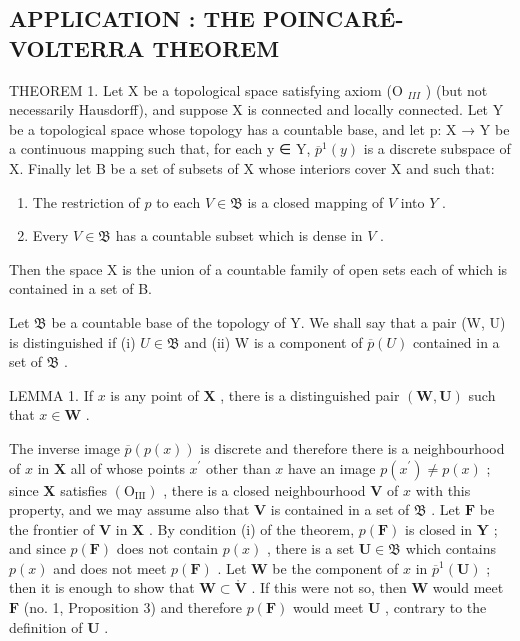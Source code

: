 \subsection{APPLICATION : THE POINCARÉ-VOLTERRA THEOREM}

THEOREM 1. Let X be a topological space satisfying axiom (O \(_{III}\) ) (but not necessarily Hausdorff), and suppose X is connected and locally connected. Let Y be a topological space whose topology has a countable base, and let p: X → Y be a continuous mapping such that, for each y ∈ Y, \(\overline{p}^{1}(y)\) is a discrete subspace of X. Finally let B be a set of subsets of X whose interiors cover X and such that:

\begin{enumerate}
\def\labelenumi{(\roman{enumi})}
\tightlist
\item
  The restriction of \(p\) to each \(V \in \mathfrak{B}\) is a closed mapping of \(V\) into \(Y\) .\\
\item
  Every \(V \in \mathfrak{B}\) has a countable subset which is dense in \(V\) .
\end{enumerate}

Then the space X is the union of a countable family of open sets each of which is contained in a set of B.

Let \(\mathfrak{B}\) be a countable base of the topology of Y. We shall say that a pair (W, U) is distinguished if (i) \(U \in \mathfrak{B}\) and (ii) W is a component of \(\overline{p}(U)\) contained in a set of \(\mathfrak{B}\) .

LEMMA 1. If \(x\) is any point of \(\mathbf{X}\) , there is a distinguished pair \((\mathbf{W}, \mathbf{U})\) such that \(x \in \mathbf{W}\) .

The inverse image \(\overline{p} (p(x))\) is discrete and therefore there is a neighbourhood of \(x\) in \(\mathbf{X}\) all of whose points \(x^{\prime}\) other than \(x\) have an image \(p(x^{\prime})\neq p(x)\) ; since \(\mathbf{X}\) satisfies \((\mathrm{O}_{\mathrm{III}})\) , there is a closed neighbourhood \(\mathbf{V}\) of \(x\) with this property, and we may assume also that \(\mathbf{V}\) is contained in a set of \(\mathfrak{B}\) . Let \(\mathbf{F}\) be the frontier of \(\mathbf{V}\) in \(\mathbf{X}\) . By condition (i) of the theorem, \(p(\mathbf{F})\) is closed in \(\mathbf{Y}\) ; and since \(p(\mathbf{F})\) does not contain \(p(x)\) , there is a set \(\mathbf{U}\in \mathfrak{B}\) which contains \(p(x)\) and does not meet \(p(\mathbf{F})\) . Let \(\mathbf{W}\) be the component of \(x\) in \(\overline{p}^{1}(\mathbf{U})\) ; then it is enough to show that \(\mathbf{W}\subset \mathring{\mathbf{V}}\) . If this were not so, then \(\mathbf{W}\) would meet \(\mathbf{F}\) (no. 1, Proposition 3) and therefore \(p(\mathbf{F})\) would meet \(\mathbf{U}\) , contrary to the definition of \(\mathbf{U}\) .

